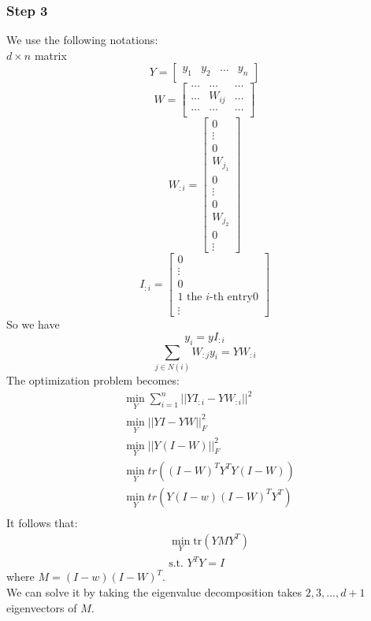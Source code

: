\subsubsection*{Step 3}
We use the following notations:\\
$d\times n$ matrix
\[
Y=
\begin{bmatrix}
    y_1 & y_2 & \dots & y_n \\
\end{bmatrix}
\]
\[
W=
\begin{bmatrix}
    \dots & \dots & \dots\\
    \dots & W_{ij} & \dots\\
    \dots & \dots & \dots\\
\end{bmatrix}
\]
\[
W_{:i}=
\begin{bmatrix}
    0 \\
    \vdots\\
    0\\
    W_{j_1}\\
    0\\
    \vdots\\
    0\\
    W_{j_2}\\
    0\\
    \vdots
\end{bmatrix}
\]
\[
I_{:i}=
\begin{bmatrix}
    0 \\
    \vdots\\
    0\\
    1 \text{ the }i\text{-th entry}
    0\\
    \vdots
\end{bmatrix}
\]
So we have
\[
y_i = y I_{:i}
\]
\[
\sum_{j\in N(i)} W_{:j} y_i = Y W_{:i}
\]
The optimization problem becomes:
\begin{align*}
&\min_{Y} \sum_{i=1}^n ||Y I_{:i} - Y W_{:i}||^2\\
&\min_{Y} ||Y I - Y W||_F^2\\
&\min_{Y} ||Y(I-W)||_F^2\\
&\min_Y tr((I-W)^T Y^T Y (I-W))\\
&\min_Y tr(Y(I-w)(I-W)^TY^T)\\
\end{align*}
It follows that:
\begin{align*}
&\min_Y \text{tr}(YMY^T)\\
&\text{s.t. } Y^TY=I
\end{align*}
where $M = (I-w)(I-W)^T$.\\
We can solve it by taking the eigenvalue decomposition takes
$2,3,...,d+1$ eigenvectors of $M$.\\ 
